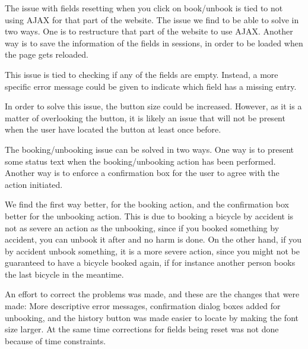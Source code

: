 \begin{description}[style=nextline]
	\item[{\#}1 Fields reset]
	The issue with fields resetting when you click on book/unbook is tied to not using AJAX for that part of the website.
	The issue we find to be able to solve in two ways.
	One is to restructure that part of the website to use AJAX.
	Another way is to save the information of the fields in sessions, in order to be loaded when the page gets reloaded. 
	\item[{\#}2 Error message understandability]
	This issue is tied to checking if any of the fields are empty.
	Instead, a more specific error message could be given to indicate which field has a missing entry.
	\item[{\#}3 Difficulty finding history]
	In order to solve this issue, the button size could be increased.
	However, as it is a matter of overlooking the button, it is likely an issue that will not be present when the user have located the button at least once before.
	\item[{\#}4 Booking/Unbooking confirmation]
	The booking/unbooking issue can be solved in two ways.
	One way is to present some status text when the booking/unbooking action has been performed.
	Another way is to enforce a confirmation box for the user to agree with the action initiated.
	
	We find the first way better, for the booking action, and the confirmation box better for the unbooking action.
	This is due to booking a bicycle by accident is not as severe an action as the unbooking, since if you booked something by accident, you can unbook it after and no harm is done.
	On the other hand, if you by accident unbook something, it is a more severe action, since you might not be guaranteed to have a bicycle booked again, if for instance another person books the last bicycle in the meantime.
\end{description}

An effort to correct the problems was made, and these are the changes that were made: More descriptive error messages, confirmation dialog boxes added for unbooking, and the history button was made easier to locate by making the font size larger.
At the same time corrections for fields being reset was not done because of time constraints.